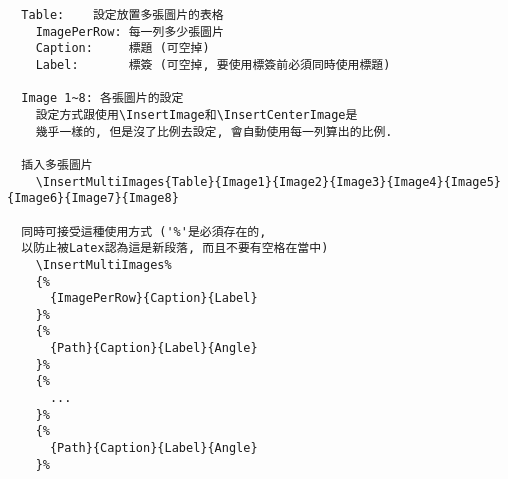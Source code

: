   \begin{framed}
  \begin{verbatim}
  Table:    設定放置多張圖片的表格
    ImagePerRow: 每一列多少張圖片
    Caption:     標題 (可空掉)
    Label:       標簽 (可空掉, 要使用標簽前必須同時使用標題)

  Image 1~8: 各張圖片的設定
    設定方式跟使用\InsertImage和\InsertCenterImage是
    幾乎一樣的, 但是沒了比例去設定, 會自動使用每一列算出的比例.

  插入多張圖片
    \InsertMultiImages{Table}{Image1}{Image2}{Image3}{Image4}{Image5}{Image6}{Image7}{Image8}

  同時可接受這種使用方式 ('%'是必須存在的,
  以防止被Latex認為這是新段落, 而且不要有空格在當中)
    \InsertMultiImages%
    {%
      {ImagePerRow}{Caption}{Label}
    }%
    {%
      {Path}{Caption}{Label}{Angle}
    }%
    {%
      ...
    }%
    {%
      {Path}{Caption}{Label}{Angle}
    }%
  \end{verbatim}
  \end{framed}

  \newpage

